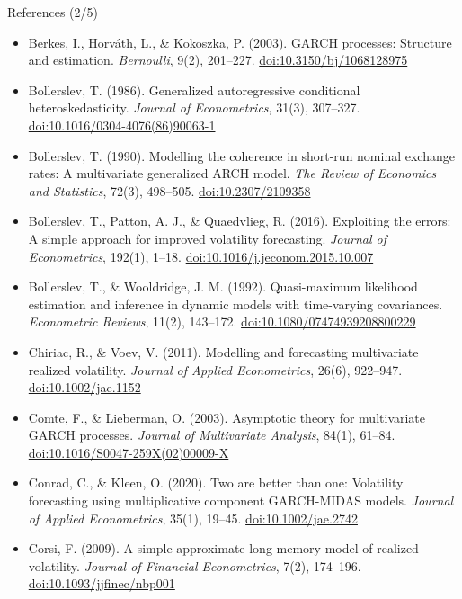 \begin{frame}{References (2/5)}
\itemsize{\tiny}
\begin{itemize}
    \item Berkes, I., Horváth, L., \& Kokoszka, P. (2003). GARCH processes: Structure and estimation. \textit{Bernoulli}, 9(2), 201--227. \href{https://doi.org/10.3150/bj/1068128975}{doi:10.3150/bj/1068128975}
    \item Bollerslev, T. (1986). Generalized autoregressive conditional heteroskedasticity. \textit{Journal of Econometrics}, 31(3), 307--327. \href{https://doi.org/10.1016/0304-4076(86)90063-1}{doi:10.1016/0304-4076(86)90063-1}
    \item Bollerslev, T. (1990). Modelling the coherence in short-run nominal exchange rates: A multivariate generalized ARCH model. \textit{The Review of Economics and Statistics}, 72(3), 498--505. \href{https://doi.org/10.2307/2109358}{doi:10.2307/2109358}
    \item Bollerslev, T., Patton, A. J., \& Quaedvlieg, R. (2016). Exploiting the errors: A simple approach for improved volatility forecasting. \textit{Journal of Econometrics}, 192(1), 1--18. \href{https://doi.org/10.1016/j.jeconom.2015.10.007}{doi:10.1016/j.jeconom.2015.10.007}
    \item Bollerslev, T., \& Wooldridge, J. M. (1992). Quasi-maximum likelihood estimation and inference in dynamic models with time-varying covariances. \textit{Econometric Reviews}, 11(2), 143--172. \href{https://doi.org/10.1080/07474939208800229}{doi:10.1080/07474939208800229}
    \item Chiriac, R., \& Voev, V. (2011). Modelling and forecasting multivariate realized volatility. \textit{Journal of Applied Econometrics}, 26(6), 922--947. \href{https://doi.org/10.1002/jae.1152}{doi:10.1002/jae.1152}
    \item Comte, F., \& Lieberman, O. (2003). Asymptotic theory for multivariate GARCH processes. \textit{Journal of Multivariate Analysis}, 84(1), 61--84. \href{https://doi.org/10.1016/S0047-259X(02)00009-X}{doi:10.1016/S0047-259X(02)00009-X}
    \item Conrad, C., \& Kleen, O. (2020). Two are better than one: Volatility forecasting using multiplicative component GARCH-MIDAS models. \textit{Journal of Applied Econometrics}, 35(1), 19--45. \href{https://doi.org/10.1002/jae.2742}{doi:10.1002/jae.2742}
    \item Corsi, F. (2009). A simple approximate long-memory model of realized volatility. \textit{Journal of Financial Econometrics}, 7(2), 174--196. \href{https://doi.org/10.1093/jjfinec/nbp001}{doi:10.1093/jjfinec/nbp001}

\end{itemize}
\end{frame}
